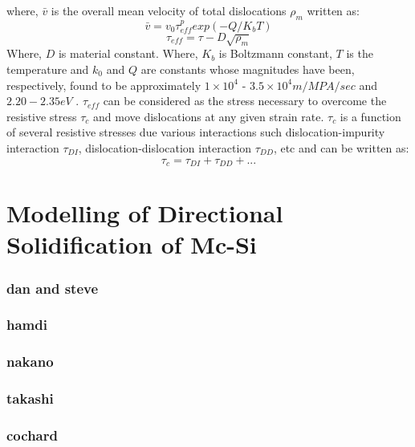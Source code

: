 where, $\bar{v}$ is the overall mean velocity of total dislocations $\rho_{m}$ written as:
\begin{equation}
   \bar{v} = v_{0} \tau_{eff}^{p} exp(-Q/K_{b}T)  \label{mean_velocity}
\end{equation}
\begin{equation}
   \tau_{eff} = \tau -  D\sqrt{\rho_{m}} \label{has-creep}
\end{equation}
Where, $D$ is material constant.
Where, $K_{b}$ is Boltzmann constant, $T$ is the temperature and $k_{0}$ and $Q$ are constants whose magnitudes have been, respectively, found to be approximately $1 \times10^{4}$ - $3.5 \times 10^{4} m/MPA/ sec$ and $2.20 - 2.35 eV$ \cite{imai1983situ}. $\tau_{eff}$ can be considered as the stress necessary to overcome the resistive stress $\tau_{c}$ and move dislocations at any given strain rate. $\tau_{c}$ is a function of several resistive stresses due various interactions such dislocation-impurity interaction $\tau_{DI}$, dislocation-dislocation interaction $\tau_{DD}$, etc \cite{sumino1983interaction} and can be written as: 
\begin{equation}
   \tau_{c} = \tau_{DI} + \tau_{DD} + ...\label{tau_c}
\end{equation}


\section{Modelling of Directional Solidification of Mc-Si}

\subsubsection{dan and steve}
\subsubsection{hamdi}
\subsubsection{nakano}
\subsubsection{takashi}
\subsubsection{cochard}


